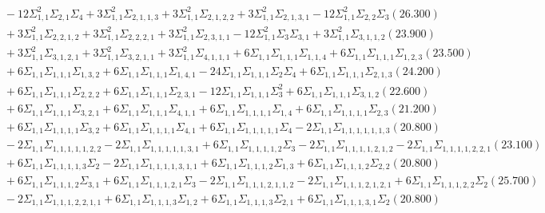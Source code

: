 \documentclass[12pt]{article}
\begin{document}
\begin{landscape}
\begin{align*}
		&\quad\quad -12\Sigma_{1,1}^{2}\Sigma_{2,1}\Sigma_{4}+3\Sigma_{1,1}^{2}\Sigma_{2,1,1,3}+3\Sigma_{1,1}^{2}\Sigma_{2,1,2,2}+3\Sigma_{1,1}^{2}\Sigma_{2,1,3,1}-12\Sigma_{1,1}^{2}\Sigma_{2,2}\Sigma_{3}(26.300) \\ 
		&\quad\quad +3\Sigma_{1,1}^{2}\Sigma_{2,2,1,2}+3\Sigma_{1,1}^{2}\Sigma_{2,2,2,1}+3\Sigma_{1,1}^{2}\Sigma_{2,3,1,1}-12\Sigma_{1,1}^{2}\Sigma_{3}\Sigma_{3,1}+3\Sigma_{1,1}^{2}\Sigma_{3,1,1,2}(23.900) \\ 
		&\quad\quad +3\Sigma_{1,1}^{2}\Sigma_{3,1,2,1}+3\Sigma_{1,1}^{2}\Sigma_{3,2,1,1}+3\Sigma_{1,1}^{2}\Sigma_{4,1,1,1}+6\Sigma_{1,1}\Sigma_{1,1,1}\Sigma_{1,1,4}+6\Sigma_{1,1}\Sigma_{1,1,1}\Sigma_{1,2,3}(23.500) \\ 
		&\quad\quad +6\Sigma_{1,1}\Sigma_{1,1,1}\Sigma_{1,3,2}+6\Sigma_{1,1}\Sigma_{1,1,1}\Sigma_{1,4,1}-24\Sigma_{1,1}\Sigma_{1,1,1}\Sigma_{2}\Sigma_{4}+6\Sigma_{1,1}\Sigma_{1,1,1}\Sigma_{2,1,3}(24.200) \\ 
		&\quad\quad +6\Sigma_{1,1}\Sigma_{1,1,1}\Sigma_{2,2,2}+6\Sigma_{1,1}\Sigma_{1,1,1}\Sigma_{2,3,1}-12\Sigma_{1,1}\Sigma_{1,1,1}\Sigma_{3}^{2}+6\Sigma_{1,1}\Sigma_{1,1,1}\Sigma_{3,1,2}(22.600) \\ 
		&\quad\quad +6\Sigma_{1,1}\Sigma_{1,1,1}\Sigma_{3,2,1}+6\Sigma_{1,1}\Sigma_{1,1,1}\Sigma_{4,1,1}+6\Sigma_{1,1}\Sigma_{1,1,1,1}\Sigma_{1,4}+6\Sigma_{1,1}\Sigma_{1,1,1,1}\Sigma_{2,3}(21.200) \\ 
		&\quad\quad +6\Sigma_{1,1}\Sigma_{1,1,1,1}\Sigma_{3,2}+6\Sigma_{1,1}\Sigma_{1,1,1,1}\Sigma_{4,1}+6\Sigma_{1,1}\Sigma_{1,1,1,1,1}\Sigma_{4}-2\Sigma_{1,1}\Sigma_{1,1,1,1,1,1,3}(20.800) \\ 
		&\quad\quad -2\Sigma_{1,1}\Sigma_{1,1,1,1,1,2,2}-2\Sigma_{1,1}\Sigma_{1,1,1,1,1,3,1}+6\Sigma_{1,1}\Sigma_{1,1,1,1,2}\Sigma_{3}-2\Sigma_{1,1}\Sigma_{1,1,1,1,2,1,2}-2\Sigma_{1,1}\Sigma_{1,1,1,1,2,2,1}(23.100) \\ 
		&\quad\quad +6\Sigma_{1,1}\Sigma_{1,1,1,1,3}\Sigma_{2}-2\Sigma_{1,1}\Sigma_{1,1,1,1,3,1,1}+6\Sigma_{1,1}\Sigma_{1,1,1,2}\Sigma_{1,3}+6\Sigma_{1,1}\Sigma_{1,1,1,2}\Sigma_{2,2}(20.800) \\ 
		&\quad\quad +6\Sigma_{1,1}\Sigma_{1,1,1,2}\Sigma_{3,1}+6\Sigma_{1,1}\Sigma_{1,1,1,2,1}\Sigma_{3}-2\Sigma_{1,1}\Sigma_{1,1,1,2,1,1,2}-2\Sigma_{1,1}\Sigma_{1,1,1,2,1,2,1}+6\Sigma_{1,1}\Sigma_{1,1,1,2,2}\Sigma_{2}(25.700) \\ 
		&\quad\quad -2\Sigma_{1,1}\Sigma_{1,1,1,2,2,1,1}+6\Sigma_{1,1}\Sigma_{1,1,1,3}\Sigma_{1,2}+6\Sigma_{1,1}\Sigma_{1,1,1,3}\Sigma_{2,1}+6\Sigma_{1,1}\Sigma_{1,1,1,3,1}\Sigma_{2}(20.800) \\ 

\end{align*}
\end{landscape}
\end{document}
